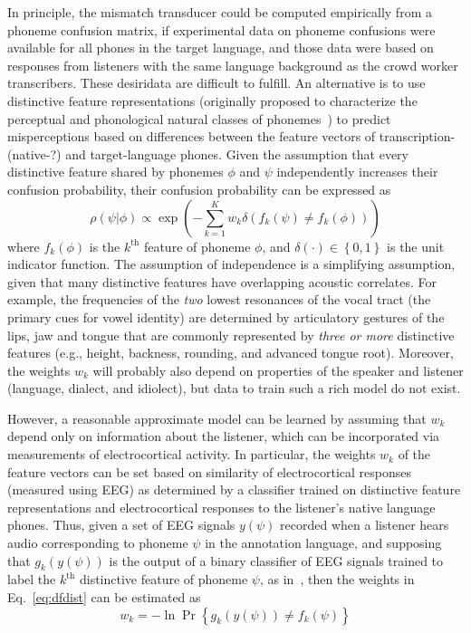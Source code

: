 In principle, the mismatch transducer could be computed empirically from
a phoneme confusion matrix, if experimental data on phoneme confusions
were available for all phones in the target language, and those data
were based on responses from listeners with the same language background
as the crowd worker transcribers. These desiridata are difficult to
fulfill. An alternative is to use distinctive feature representations
(originally proposed to characterize the perceptual and phonological
natural classes of phonemes~\cite{Jakobson52}) to predict misperceptions
based on differences between the feature vectors of transcription-(native-?) and
target-language phones. Given the assumption that every distinctive
feature shared by phonemes $\phi$ and $\psi$ independently increases
their confusion probability, their confusion probability can be
expressed as
\begin{equation}
  \rho(\psi|\phi)\propto \exp\left(-\sum_{k=1}^K
  w_k\delta\left(f_k(\psi)\ne f_k(\phi)\right)\right)
  \label{eq:dfdist}
\end{equation}
where $f_k(\phi)$ is the $k^{\textrm{th}}$ feature of phoneme $\phi$,
and $\delta(\cdot)\in\left\{0,1\right\}$ is the unit indicator
function. The assumption of independence is a simplifying assumption,
given that many distinctive features have overlapping acoustic
correlates. For example, the frequencies of the {\em two} lowest
resonances of the vocal tract (the primary cues for vowel identity) are
determined by articulatory gestures of the lips, jaw and tongue that are
commonly represented by {\em three or more} distinctive features
(e.g., height, backness, rounding, and advanced tongue root). Moreover,
the weights $w_k$ will probably also depend on properties of the speaker
and listener (language, dialect, and idiolect), but data to train such a
rich model do not exist.

However, a reasonable approximate model can be learned by assuming that
$w_k$ depend only on information about the listener, which can be
incorporated via measurements of electrocortical activity. In particular,
the weights $w_k$ of the feature vectors can be set based on similarity
of electrocortical responses (measured using EEG) as determined by a
classifier trained on distinctive feature representations and
electrocortical responses to the listener's native language phones. Thus,
given a set of EEG signals $y(\psi)$ recorded when a listener
hears audio corresponding to phoneme $\psi$ in the annotation
language, and supposing that $g_k(y(\psi))$ is the output of a binary
classifier of EEG signals trained to label the $k^{\textrm{th}}$
distinctive feature of phoneme $\psi$, as in~\cite{Liberto15}, then
the weights in Eq.~\ref{eq:dfdist} can be estimated as
\begin{equation}
  w_k = -\ln\Pr\left\{g_k(y(\psi))\ne f_k(\psi)\right\}
  \label{eq:eegdist}
\end{equation}
